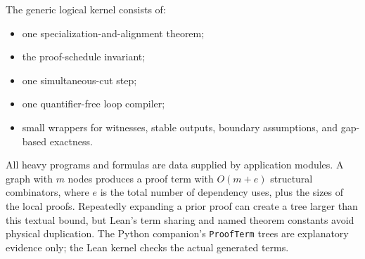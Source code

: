 The generic logical kernel consists of:
\begin{itemize}
  \item one specialization-and-alignment theorem;
  \item the proof-schedule invariant;
  \item one simultaneous-cut step;
  \item one quantifier-free loop compiler;
  \item small wrappers for witnesses, stable outputs, boundary assumptions, and gap-based exactness.
\end{itemize}
All heavy programs and formulas are data supplied by application modules.  A graph with \(m\) nodes
produces a proof term with \(O(m+e)\) structural combinators, where \(e\) is the total number of dependency
uses, plus the sizes of the local proofs.  Repeatedly expanding a prior proof can create a tree larger than
this textual bound, but Lean's term sharing and named theorem constants avoid physical duplication.
The Python companion's \texttt{ProofTerm} trees are explanatory evidence only; the Lean kernel checks the
actual generated terms.
